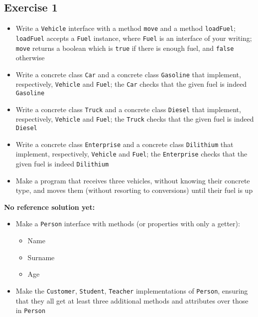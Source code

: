 	    \subsection{Exercise 1}
	        \begin{itemize}
	            \item Write a \texttt{Vehicle} interface with a method \texttt{move} and a method \texttt{loadFuel}; \texttt{loadFuel} accepts a \texttt{Fuel} instance, where \texttt{Fuel} is an interface of your writing; \texttt{move} returns a boolean which is \texttt{true} if there is enough fuel, and \texttt{false} otherwise
	            \item Write a concrete class \texttt{Car} and a concrete class \texttt{Gasoline} that implement, respectively, \texttt{Vehicle} and \texttt{Fuel}; the \texttt{Car} checks that the given fuel is indeed \texttt{Gasoline}
	            \item Write a concrete class \texttt{Truck} and a concrete class \texttt{Diesel} that implement, respectively, \texttt{Vehicle} and \texttt{Fuel}; the \texttt{Truck} checks that the given fuel is indeed \texttt{Diesel}
	            \item Write a concrete class \texttt{Enterprise} and a concrete class \texttt{Dilithium} that implement, respectively, \texttt{Vehicle} and \texttt{Fuel}; the \texttt{Enterprise} checks that the given fuel is indeed \texttt{Dilithium}
	            \item Make a program that receives three vehicles, without knowing their concrete type, and moves them (without resorting to conversions) until their fuel is up
	        \end{itemize}
	
	        \textbf{No reference solution yet:}
	        \begin{itemize}
	            \item Make a \texttt{Person} interface with methods (or properties with only a getter):
	            \begin{itemize}
	                \item Name
	                \item Surname
	                \item Age
	            \end{itemize}
	
	            \item Make the \texttt{Customer}, \texttt{Student}, \texttt{Teacher} implementations of \texttt{Person}, ensuring that they all get at least three additional methods and attributes over those in \texttt{Person}
	        \end{itemize}
